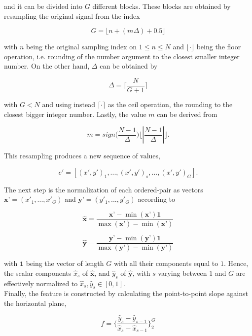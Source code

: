 \noindent and it can be divided into $G$ different blocks.  These blocks are obtained by resampling the original signal from the index 

\begin{equation}
G = \lfloor n + ( m \Delta ) + 0.5 \rfloor
\label{eq:shcc2}
\end{equation}

\noindent with $n$ being the original sampling index on $ 1 \leq n \leq N $ and $\lfloor \cdot \rfloor$ being the floor operation, i.e. rounding of the number argument to the closest smaller integer number.  On the other hand, $\Delta$ can be obtained by

\begin{equation}
\Delta = \bigg \lceil \frac{N}{G+1} \bigg \rceil
\label{eq:shcc3}
\end{equation}

\noindent with $ G < N $ and using instead $\lceil \cdot \rceil$ as the ceil operation, the rounding to the closest bigger integer number. Lastly, the value $m$ can be derived from

\begin{equation}
m = sign \bigg (  \frac{N-1}{\Delta} \bigg )  \bigg \lfloor \left\lvert \frac{N-1}{\Delta} \right\lvert \bigg \rfloor.
\label{eq:shcc4}
\end{equation}

This resampling produces a new sequence of values,

\begin{equation}
e' = \left[ (x',y')_{1}, ...,(x',y')_{s}, ..., (x',y')_{G} \right].
\label{eq:shcc5}
\end{equation}

The next step is the normalization of each ordered-pair as vectors $\textbf{x'} = (x'_{1},...,x'_{G})$ and $\textbf{y'} = (y'_{1},...,y'_{G})$ according to

\begin{equation}
\hat{\textbf{x}} = \frac{\textbf{x'} - \min(\textbf{x'}) \textbf{1} }{\max(\textbf{x'}) - \min(\textbf{x'})} 
\label{eq:shcc6}
\end{equation}

\begin{equation}
\hat{\textbf{y}} = \frac{ \textbf{y'} - \min(\textbf{y'}) \textbf{1}}{\max(\textbf{y'}) - \min(\textbf{y'})} 
\label{eq:shcc7}
\end{equation}

\noindent with $\textbf{1}$ being the vector of length $G$ with all their components equal to $1$.  Hence, the scalar components $\hat{x}_{s}$ of $\hat{\textbf{x}}$, and $\hat{y}_{s}$ of $\hat{\textbf{y}}$, with $s$ varying between $1$ and $G$ are effectively normalized to $\hat{x}_{s},\hat{y}_{s} \in [0,1]$. \\

Finally, the feature is constructed by calculating the point-to-point slope against the horizontal plane,

\begin{equation}
f = \bigg \{  \frac{\hat{y}_{s}-\hat{y}_{s-1}}{\hat{x}_{s}-\hat{x}_{s-1}}  \bigg \}_{2}^{G} 
\label{eq:shcc8}
\end{equation}


